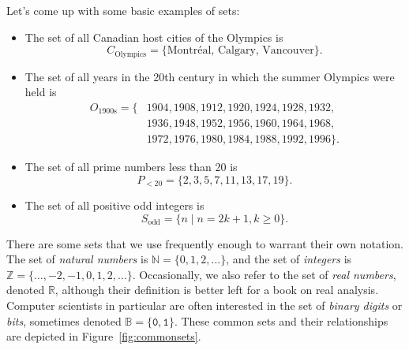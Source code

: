\begin{example}
Let's come up with some basic examples of sets:
\begin{itemize}
	\item The set of all Canadian host cities of the Olympics is
	\begin{equation*}
	C_{\text{Olympics}} = \{\text{Montr\'{e}al}, \, \text{Calgary}, \, \text{Vancouver}\}.
	\end{equation*}
	
	\item The set of all years in the 20th century in which the summer Olympics were held is
	\begin{equation*}
	\begin{split}
	O_{\text{1900s}} = \{&1904, 1908, 1912, 1920, 1924, 1928, 1932, \\
		&1936, 1948, 1952, 1956, 1960, 1964, 1968, \\
		&1972, 1976, 1980, 1984, 1988, 1992, 1996\}.
	\end{split}
	\end{equation*}
	
	\item The set of all prime numbers less than 20 is
	\begin{equation*}
	P_{<20} = \{2, 3, 5, 7, 11, 13, 17, 19\}.
	\end{equation*}
	
	\item The set of all positive odd integers is
	\begin{equation*}
	S_{\text{odd}} = \{n \mid n = 2k+1, k \geq 0\}.
	\end{equation*}
\end{itemize}
\end{example}

There are some sets that we use frequently enough to warrant their own notation. The set of \emph{natural numbers} is $\mathbb{N} = \{0, 1, 2, \dots\}$, and the set of \emph{integers} is $\mathbb{Z} = \{\dots, -2, -1, 0, 1, 2, \dots\}$. Occasionally, we also refer to the set of \emph{real numbers}, denoted $\mathbb{R}$, although their definition is better left for a book on real analysis. Computer scientists in particular are often interested in the set of \emph{binary digits} or \emph{bits}, sometimes denoted $\mathbb{B} = \{\texttt{0}, \texttt{1}\}$. These common sets and their relationships are depicted in Figure~\ref{fig:commonsets}.

